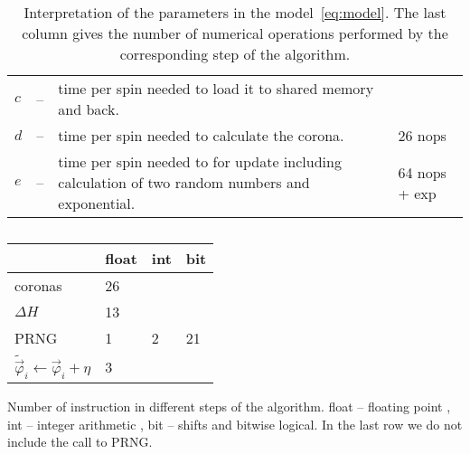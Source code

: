 \documentclass[a4paper]{llncs}
\newcommand{\vphi}{\vec{\varphi}}
\begin{document}
\begin{table}
\begin{center} \begin{tabular}{lcp{8cm}p{2cm}}
$c$ &--& time per spin needed to load it to shared memory and back.&\\
$d$ &--& time per spin needed to calculate the corona.& 26 nops\\
$e$ &--& time per spin needed to for update including calculation of two random numbers and exponential. & 64 nops + exp
\end{tabular}
\end{center}
\caption{\label{tab:pars-int}Interpretation of the parameters in the model~\ref{eq:model}. The last column gives the number of numerical operations performed by the corresponding step of the algorithm.}
\end{table}

\begin{table}
\begin{center} 
\begin{tabular}{|p{4cm}|l|l|l|}\hline\hline
 & float & int  & bit \\\hline
coronas & 26 & & \\\hline
$\Delta H  $ & 13  & & \\\hline
PRNG & 1 & 2  & 21  \\\hline
$\widetilde{\vphi}_i \gets \vphi_i+\eta$& 3 & &\\\hline\hline
\end{tabular}
\end{center}
\caption{\label{tab:instr-count}}Number of instruction in different  steps of the algorithm. float -- floating point , int -- integer arithmetic , bit -- shifts and bitwise logical. In the last row we do not include the call to PRNG. 
\end{table}
\end{document}
